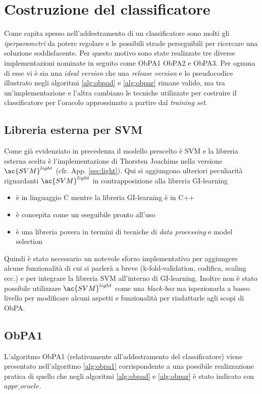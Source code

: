 \section{Costruzione del classificatore}
Come capita spesso nell'addestramento di un classificatore  sono molti gli \textit{iperparametri} da potere regolare e le possibili strade perseguibili per ricercare una soluzione soddisfacente. Per questo motivo sono state realizzate tre diverse implementazioni nominate in seguito come \ac{ObPA}1 \ac{ObPA}2 e \ac{ObPA}3. Per ognuna di esse vi è sia una \textit{ideal version} che una \textit{release version} e lo pseudocodice illustrato negli algoritmi \ref{alg:obpad} e \ref{alg:obpar} rimane valido, ma tra un'implementazione e l'altra cambiano le tecniche utilizzate per costruire il classificatore per l'oracolo approssimato a partire dal \textit{training set}.

\subsection{Libreria esterna per SVM}
Come già evidenziato in precedenza il modello prescelto è \ac{SVM} e la libreria esterna scelta è l'implementazione di Thorsten Joachims nella versione $\ac{SVM}^{light}$ (cfr. App. \ref{sec:light}). Qui si aggiungono ulteriori peculiarità riguardanti $\ac{SVM}^{light}$ in contrapposizione alla libreria GI-learning
\begin{itemize}
\item è in linguaggio C mentre la libreria GI-learning è in C++
\item è concepita come un eseguibile pronto all'uso
\item è una libreria povera  in termini di tecniche di \textit{data processing} e model selection

\end{itemize}
 Quindi è stato necessario un notevole sforzo implementativo per aggiungere alcune funzionalità di cui si parlerà a breve (k-fold-validation, codifica, scaling ecc.) e per integrare la libreria \ac{SVM} all'interno di GI-learning. Inoltre non è stato possibile utilizzare  $\ac{SVM}^{light}$ come una \textit{black-box} ma ispezionarla a basso livello per modificare alcuni aspetti e funzionalità per riadattarle agli scopi di \ac{ObPA}.\\

\subsection{ObPA1}
L'algoritmo \ac{ObPA}1 (relativamente all'addestramento del classificatore) viene presentato nell'algoritmo \ref{alg:obpa1} corrispondente a una possibile realizzazione pratica di quello che negli algoritmi \ref{alg:obpad} e \ref{alg:obpar}  è stato indicato con $appr\_oracle$.

